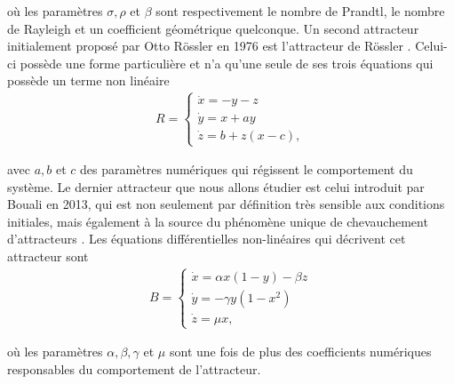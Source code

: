     où les paramètres $\sigma, \rho$ et $\beta$ sont respectivement le nombre
    de Prandtl, le nombre de Rayleigh et un coefficient géométrique quelconque.
    Un second attracteur initialement proposé par Otto Rössler en 1976 est
    l'attracteur de Rössler \cite{rossler}. Celui-ci possède une forme
    particulière et n'a qu'une seule de ses trois équations qui possède un
    terme non linéaire
    \begin{align}
        R = \left\{
        \begin{array}{c}
           \Dot{x} = -y - z \\
           \Dot{y} = x + ay \\
           \Dot{z} = b + z(x - c),
        \end{array}
        \right.
        \label{eq : rossler}
    \end{align}

    avec $a, b$ et $c$ des paramètres numériques qui régissent le comportement
    du système. Le dernier attracteur que nous allons étudier est celui
    introduit par Bouali en 2013, qui est non seulement par définition très
    sensible aux conditions initiales, mais également à la source du phénomène
    unique de chevauchement d'attracteurs \cite{bouali}. Les équations
    différentielles non-linéaires qui décrivent cet attracteur sont
        \begin{align}
        B = \left\{
        \begin{array}{c}
           \Dot{x} = \alpha x(1 - y) - \beta z \\
           \Dot{y} = -\gamma y(1 - x^2) \\
           \Dot{z} = \mu x,
        \end{array}
        \right.
        \label{eq : bouali}
    \end{align}

    où les paramètres $\alpha, \beta, \gamma$ et $\mu$ sont une fois de plus
    des coefficients numériques responsables du comportement de l'attracteur.

